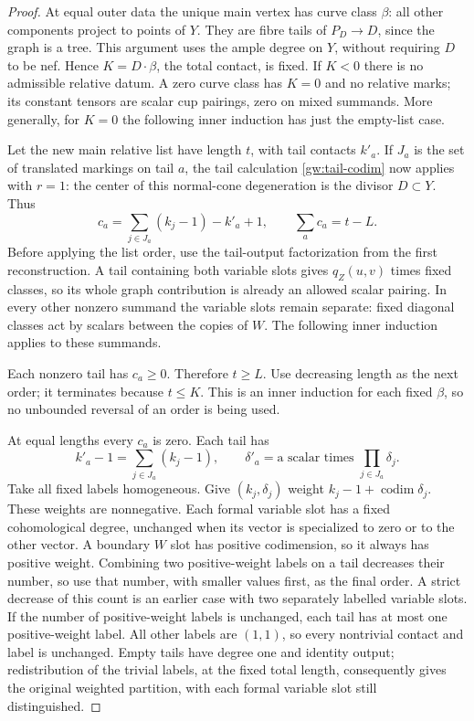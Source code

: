 \begin{proof}
At equal outer data the unique main vertex has curve class $\beta$:
all other components project to points of $Y$.  They are fibre tails of
$P_D\to D$, since the graph is a tree.  This argument uses the ample degree
on $Y$, without requiring $D$ to be nef.  Hence
$K=D\cdot\beta$, the total contact, is fixed.  If $K<0$ there is no
admissible relative datum.  A zero curve class has $K=0$ and no relative
marks; its constant tensors are scalar cup pairings, zero on mixed
summands.  More generally, for $K=0$ the following inner induction has just
the empty-list case.

Let the new main relative list have length $t$, with tail contacts $k'_a$.
If $J_a$ is the set of
translated markings on tail $a$, the tail calculation
\eqref{gw:tail-codim} now applies with $r=1$: the center of this
normal-cone degeneration is the divisor $D\subset Y$.
Thus
\begin{equation}\label{gw:divisor-order}
c_a=\sum_{j\in J_a}(k_j-1)-k'_a+1,
 \qquad
 \sum_a c_a=t-L.
\end{equation}
Before applying the list order, use the tail-output factorization from the
first reconstruction.  A tail containing both variable slots gives
$q_Z(u,v)$ times fixed classes, so its whole graph contribution is already
an allowed scalar pairing.  In every other nonzero summand the variable
slots remain separate: fixed diagonal classes act by scalars between the
copies of $W$.  The following inner induction applies to these summands.

Each nonzero tail has $c_a\geq0$.  Therefore $t\geq L$.
Use decreasing length as the next order; it terminates because
$t\leq K$.  This is an inner induction for each fixed $\beta$, so no
unbounded reversal of an order is being used.

At equal lengths every $c_a$ is zero.  Each tail has
\[
 k'_a-1=\sum_{j\in J_a}(k_j-1),\qquad
 \delta'_a=\text{a scalar times }\prod_{j\in J_a}\delta_j.
\]
Take all fixed labels homogeneous.  Give $(k_j,\delta_j)$ weight
$k_j-1+\operatorname{codim}\delta_j$.  These weights are nonnegative.
Each formal variable slot has a fixed cohomological degree, unchanged
when its vector is specialized to zero or to the other vector.  A boundary
$W$ slot has positive codimension, so it always has positive weight.
Combining two positive-weight labels on a tail decreases their number, so
use that number, with smaller values first, as the final order.
A strict decrease of this count is an earlier case with two separately
labelled variable slots.
If the number of positive-weight labels is unchanged, each tail has at most
one positive-weight label.  All other labels are $(1,1)$, so every nontrivial contact and label
is unchanged.  Empty tails have degree one and identity output; redistribution
of the trivial labels, at the fixed total length, consequently gives the
original weighted partition, with each formal variable slot still
distinguished.


\end{proof}
